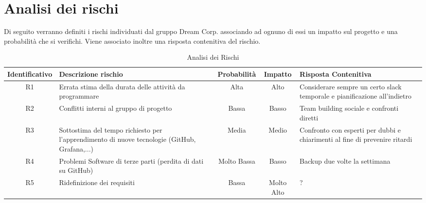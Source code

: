 \section{Analisi dei rischi}

	Di seguito verranno definiti i rischi individuati dal gruppo Dream Corp. associando ad ognuno di essi un impatto sul progetto e una probabilità che si verifichi. Viene associato inoltre una risposta contenitiva del rischio. 
	\begin{table}[h!]
		\centering
		\renewcommand{\arraystretch}{2} 
		\begin{tabular}{|c|p{3.6cm}|c|c|p{3.6cm}|}
			\rowcolor{orange!50}
			\hline
			\textbf{Identificativo} & \textbf{Descrizione rischio} & \textbf{Probabilità} & \textbf{Impatto} & \textbf{Risposta Contenitiva}\\
			\hline
			R1 & Errata stima della durata delle attività da programmare & Alta & Alto & Considerare sempre un certo slack temporale e pianificazione all’indietro\\
			\hline
			R2 & Conflitti interni al gruppo di progetto & Bassa & Basso & Team building sociale e confronti diretti\\
			\hline
			R3 & Sottostima del tempo richiesto per l’apprendimento di nuove tecnologie (GitHub, Grafana,...) & Media & Medio & Confronto con esperti per dubbi e chiarimenti al fine di prevenire ritardi\\
			\hline
			R4 & Problemi Software di terze parti (perdita di dati su GitHub) & Molto  Bassa & Basso &  Backup due volte la settimana\\
			\hline
			R5 & Ridefinizione dei requisiti & Bassa & Molto Alto & ?\\
			\hline
		\end{tabular}
		\caption{Analisi dei Rischi}
	\end{table}
	
